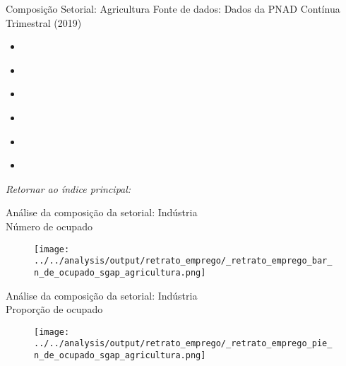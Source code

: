 \begin{frame}[label=_retrato_emprego_sgap_agricultura]{Composição Setorial: Agricultura}
{\footnotesize Fonte de dados: Dados da PNAD Contínua Trimestral (2019)}

\begin{itemize}
\item{
	\hyperlink{_retrato_emprego_bar_n_de_ocupado_sgap_agricultura}{}
	}
\item{
	\hyperlink{_retrato_emprego_pie_n_de_ocupado_sgap_agricultura}{}
	} 
\item{
	\hyperlink{_retrato_emprego_bar_n_de_formal_sgap_agricultura}{}
	} 
\item{
	\hyperlink{_retrato_emprego_pie_n_de_formal_sgap_agricultura}{}
	} 
\item{
	\hyperlink{_retrato_emprego_bar_n_de_informal_sgap_agricultura}{}
	} 	
\item{	
	\hyperlink{_retrato_emprego_pie_n_de_informal_sgap_agricultura}{}
	} 		

\end{itemize}
\begin{small}
\textit{Retornar ao índice principal: \hyperlink{indice_principal}{} }
\end{small}
\end{frame}


\begin{frame}[label=_retrato_emprego_bar_n_de_ocupado_sgap_agricultura]{{\small Análise da composição da setorial: Indústria \\  Número de ocupado}}
\textit{\hyperlink{_retrato_emprego_sgap_agricultura}{}}
\begin{figure}
  \centering
  \texttt{[image: ../../analysis/output/retrato\_emprego/\_retrato\_emprego\_bar\_n\_de\_ocupado\_sgap\_agricultura.png]}
  \caption{}
  \label{fig:_retrato_emprego_bar_n_de_ocupado_sgap_agricultura}
\end{figure}
\end{frame}


\begin{frame}[label=_retrato_emprego_pie_n_de_ocupado_sgap_agricultura]{{\small Análise da composição da setorial: Indústria \\  Proporção de ocupado}}
\textit{\hyperlink{_retrato_emprego_sgap_agricultura}{}}
\begin{figure}
  \centering
  \texttt{[image: ../../analysis/output/retrato\_emprego/\_retrato\_emprego\_pie\_n\_de\_ocupado\_sgap\_agricultura.png]}
  \caption{}
  \label{fig:_retrato_emprego_pie_n_de_ocupado_sgap_agricultura}
\end{figure}
\end{frame}


